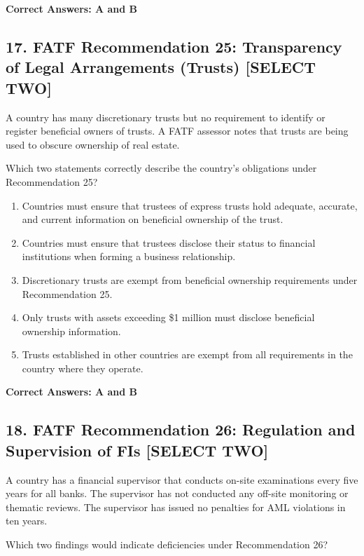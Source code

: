 \documentclass[11pt,a4paper]{article}
\begin{document}
	\textbf{Correct Answers: A and B}
	
	\subsection{17. FATF Recommendation 25: Transparency of Legal Arrangements (Trusts) \textnormal{[SELECT TWO]}}
	
	A country has many discretionary trusts but no requirement to identify or register beneficial owners of trusts. A FATF assessor notes that trusts are being used to obscure ownership of real estate.
	
	Which two statements correctly describe the country's obligations under Recommendation 25?
	
	\begin{enumerate}[label=\Alph*.]
		\item Countries must ensure that trustees of express trusts hold adequate, accurate, and current information on beneficial ownership of the trust.
		\item Countries must ensure that trustees disclose their status to financial institutions when forming a business relationship.
		\item Discretionary trusts are exempt from beneficial ownership requirements under Recommendation 25.
		\item Only trusts with assets exceeding \$1 million must disclose beneficial ownership information.
		\item Trusts established in other countries are exempt from all requirements in the country where they operate.
	\end{enumerate}
	
	\textbf{Correct Answers: A and B}
	
	\subsection{18. FATF Recommendation 26: Regulation and Supervision of FIs \textnormal{[SELECT TWO]}}
	
	A country has a financial supervisor that conducts on-site examinations every five years for all banks. The supervisor has not conducted any off-site monitoring or thematic reviews. The supervisor has issued no penalties for AML violations in ten years.
	
	Which two findings would indicate deficiencies under Recommendation 26?
	
\end{document}
